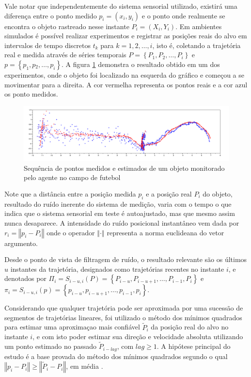 Vale notar que independentemente do sistema sensorial utilizado, existirá
uma diferença entre o ponto medido $p_{i}=(x_{i},y_{i})$ e o ponto
onde realmente se encontra o objeto rastreado nesse instante $P_{i}=(X_{i},Y_{i})$.
Em ambientes simulados é possível realizar experimentos e registrar as
posições reais do alvo em intervalos de tempo discretos $t_{k}$ para
$k=1,2,\ldots,i$, isto é, coletando a trajetória real e medida
através de séries temporais $P=\left\{ P_{1},P_{2},\ldots,P_{i}\right\} $
e $p=\left\{ p_{1},p{}_{2},\ldots,p_{i}\right\} $. A figura \ref{fig:pontossemfiltro}
demonstra o resultado obtido em um dos experimentos, onde o objeto
foi localizado na esquerda do gráfico e começou a se movimentar para
a direita. A cor vermelha representa os pontos reais e a cor
azul os ponto medidos. 

\begin{figure}[!htb]
\includegraphics[scale=0.45]{figuras/fig_pontos_medidos_e_reais}
\caption{Sequência de pontos medidos e estimados de um objeto monitorado pelo agente
no campo de futebol }
\label{fig:pontossemfiltro}
\end{figure}


Note que a distância entre a posição medida $p_{i}$ e a posição real
$P_{i}$ do objeto, resultado do ruído inerente do sistema de medição,
varia com o tempo o que indica que o sistema sensorial em teste é
autoajustado, mas que mesmo assim nunca desaparece. A intensidade
do ruído posicional instantâneo vem dada por $r_{i}=\left\Vert p_{i}-P_{i}\right\Vert $
onde o operador $\left\Vert \cdot\right\Vert $ representa a norma
euclideana do vetor argumento.

Desde o ponto de vista de filtragem de ruído, o resultado relevante
são os últimos $u$ instantes da trajetória, designados como trajetórias
recentes no instante $i$, e denotados por $\Pi_{i}=S_{i-u,i}(P)=\left\{ P_{i-u},P_{i-u+1},\ldots,P_{i-1},P_{i}\right\} $
e $\pi_{i}=S_{i-u,i}(p)=\left\{ p_{i-u},p_{i-u+1},\ldots,p_{i-1},p_{i}\right\} $. 

Considerando que qualquer trajetória pode ser aproximada por uma sucessão
de segmentos de trajetórias lineares, foi utilizado o método dos
mínimos quadrados para estimar uma aproximaçao mais confiável $\tilde{P}_{i}$
da posição real do alvo no instante $i$, e com isto poder estimar
sua direção e velocidade absoluta utilizando um ponto estimado no
passado $\tilde{P}_{i-lag}$, com $lag\geq1$. A hipótese principal
do estudo é a base provada do método dos mínimos quadrados segundo
o qual $\left\Vert p_{i}-P_{i}\right\Vert \geq\left\Vert \tilde{P}_{i}-P_{i}\right\Vert $,
em média \cite{minQuad}. 

